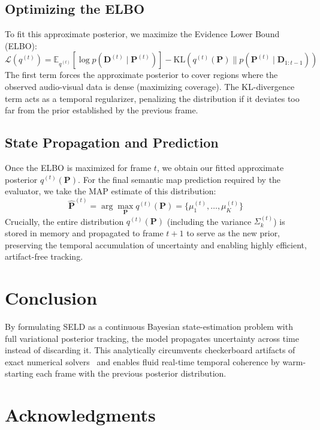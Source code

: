 \documentclass{article}
\begin{document}
\subsection{Optimizing the ELBO}
To fit this approximate posterior, we maximize the Evidence Lower Bound (ELBO):
\begin{equation}
    \mathcal{L}(q^{(t)}) = \mathbb{E}_{q^{(t)}}\left[ \log p(\mathbf{D}^{(t)} \mid \mathbf{P}^{(t)}) \right] - \text{KL}\left( q^{(t)}(\mathbf{P}) \parallel p(\mathbf{P}^{(t)} \mid \mathbf{D}_{1:t-1}) \right)
\end{equation}
The first term forces the approximate posterior to cover regions where the observed audio-visual data is dense (maximizing coverage). The KL-divergence term acts as a temporal regularizer, penalizing the distribution if it deviates too far from the prior established by the previous frame.

\subsection{State Propagation and Prediction}
Once the ELBO is maximized for frame $t$, we obtain our fitted approximate posterior $q^{(t)}(\mathbf{P})$. 
For the final semantic map prediction required by the evaluator, we take the MAP estimate of this distribution:
\begin{equation}
    \hat{\mathbf{P}}^{(t)} = \arg\max_{\mathbf{P}} q^{(t)}(\mathbf{P}) = \{\mu_1^{(t)}, \dots, \mu_K^{(t)}\}
\end{equation}
Crucially, the entire distribution $q^{(t)}(\mathbf{P})$ (including the variance $\Sigma_k^{(t)}$) is stored in memory and propagated to frame $t+1$ to serve as the new prior, preserving the temporal accumulation of uncertainty and enabling highly efficient, artifact-free tracking.

\section{Conclusion}
By formulating SELD as a continuous Bayesian state-estimation problem with full variational posterior tracking, the model propagates uncertainty across time instead of discarding it. This analytically circumvents checkerboard artifacts of exact numerical solvers~\cite{baseline2024} and enables fluid real-time temporal coherence by warm-starting each frame with the previous posterior distribution.

\section*{Acknowledgments}

  
  
\end{document}
